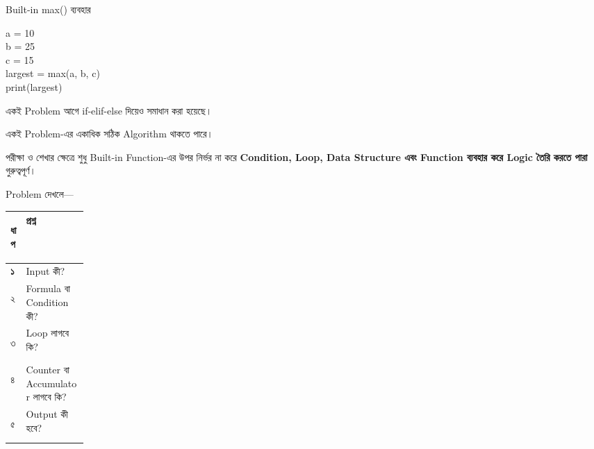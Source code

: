 \begin{codeoutputbox}{Built-in \textenglish{\ttfamily max()} ব্যবহার}

\noindent
\begin{minipage}[t]{0.50\linewidth}
\codeheading

\begin{english}
\ttfamily
a = 10\\
b = 25\\
c = 15\\[0.5mm]
largest = max(a, b, c)\\
print(largest)
\end{english}

\end{minipage}
\hfill
\begin{minipage}[t]{0.46\linewidth}
\outputheading

\begin{center}
\textenglish{}
\end{center}

একই Problem আগে
\textenglish{\ttfamily if-elif-else}
দিয়েও সমাধান করা হয়েছে।

\medskip

একই Problem-এর একাধিক সঠিক Algorithm থাকতে পারে।

\end{minipage}

\end{codeoutputbox}

\begin{rememberbox}

পরীক্ষা ও শেখার ক্ষেত্রে শুধু Built-in Function-এর উপর নির্ভর না করে
\textbf{Condition, Loop, Data Structure এবং Function ব্যবহার করে Logic তৈরি করতে পারা}
গুরুত্বপূর্ণ।

\end{rememberbox}



Problem দেখলে—

\begin{tabularx}
{\linewidth}
{
|>{\bfseries\centering\arraybackslash}p{0.13\linewidth}
|Y|
}

\hline
{}

\textbf{ধাপ}
&
\textbf{প্রশ্ন}
\\
\hline

১
&
Input কী?
\\
\hline

২
&
Formula বা Condition কী?
\\
\hline

৩
&
Loop লাগবে কি?
\\
\hline

৪
&
Counter বা Accumulator লাগবে কি?
\\
\hline

৫
&
Output কী হবে?
\\
\hline

\end{tabularx}

